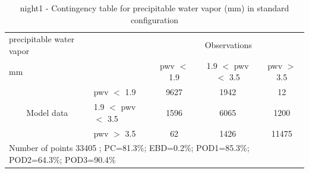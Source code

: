 \begin{table}[p!]
\begin{center}
\begin{tabular}{llccc}
\hline
{precipitable water vapor}                                       &                                                    & \multicolumn{3}{c}{Observations}                 \\
{mm}                                       &                             & pwv $<$ 1.9   & 1.9 $<$ pwv $<$ 3.5 & pwv $>$ 3.5 \\
\hline
\multicolumn{1}{c}{\multirow{3}{*}{Model data}}  & pwv $<$ 1.9             & 9627                & 1942                       & 12              \\
                                                 & 1.9  $<$ pwv $<$ 3.5 & 1596                & 6065                       & 1200              \\
                                                 & pwv $>$ 3.5             & 62                & 1426                       & 11475              \\
\hline
\multicolumn{5}{l}{ Number of points        33405 ; PC=81.3\%; EBD=0.2\%; POD1=85.3\%; POD2=64.3\%; POD3=90.4\%}                 \\
\end{tabular}
\end{center}
\caption{night1 - Contingency table for  precipitable water vapor (mm) in standard configuration  }
\label{tab:contingencypwvBEF:night1}
\end{table}
